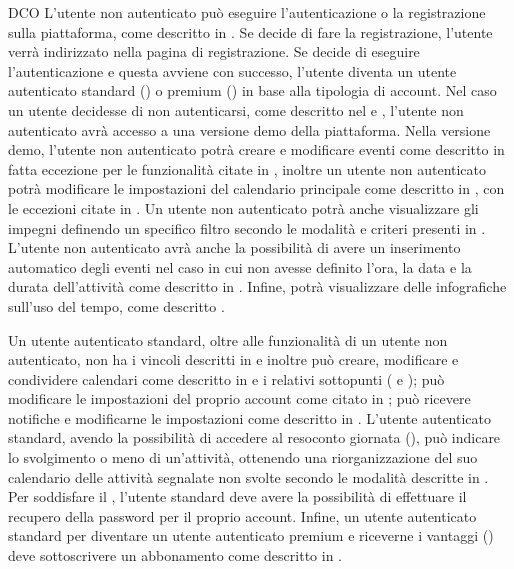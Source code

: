 \begin{listaPersonale}{DCO}
    L'utente non autenticato può eseguire l'autenticazione o la registrazione sulla piattaforma, come descritto in . Se decide di fare la registrazione, l'utente verrà indirizzato nella pagina di registrazione. Se decide di eseguire l'autenticazione e questa avviene con successo, l'utente diventa un utente autenticato standard () o premium () in base alla tipologia di account. Nel caso un utente decidesse di non autenticarsi, come descritto nel  e , l'utente non autenticato avrà accesso a una versione demo della piattaforma. Nella versione demo, l'utente non autenticato potrà creare e modificare eventi come descritto in  fatta eccezione per le funzionalità citate in , inoltre un utente non autenticato potrà modificare le impostazioni del calendario principale come descritto in , con le eccezioni citate in . Un utente non autenticato potrà anche visualizzare gli impegni definendo un specifico filtro secondo le modalità e criteri presenti in . L'utente non autenticato avrà anche la possibilità di avere un inserimento automatico degli eventi nel caso in cui non avesse definito l'ora, la data e la durata dell'attività come descritto in . Infine, potrà visualizzare delle infografiche sull'uso del tempo, come descritto .

    Un utente autenticato standard, oltre alle funzionalità di un utente non autenticato, non ha i vincoli descritti in  e inoltre può creare, modificare e condividere calendari come descritto in  e i relativi sottopunti ( e ); può modificare le impostazioni del proprio account come citato in ; può ricevere notifiche e modificarne le impostazioni come descritto in . L'utente autenticato standard, avendo la possibilità di accedere al resoconto giornata (), può indicare lo svolgimento o meno di un'attività, ottenendo una riorganizzazione del suo calendario delle attività segnalate non svolte secondo le modalità descritte in . Per soddisfare il , l'utente standard deve avere la possibilità di effettuare il recupero della password per il proprio account. Infine, un utente autenticato standard per diventare un utente autenticato premium e riceverne i vantaggi () deve sottoscrivere un abbonamento come descritto in .


\end{listaPersonale}
